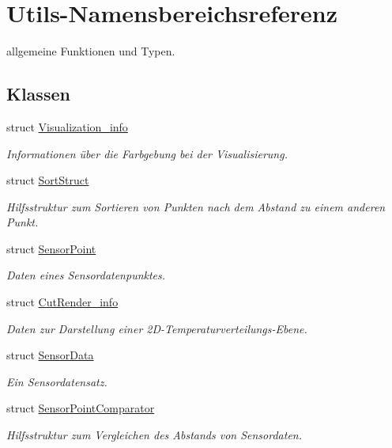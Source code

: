 \hypertarget{namespaceUtils}{\section{Utils-\/\-Namensbereichsreferenz}
\label{namespaceUtils}
}


allgemeine Funktionen und Typen.  


\subsection*{Klassen}
\begin{DoxyCompactItemize}
\item 
struct \hyperlink{structUtils_1_1Visualization__info}{Visualization\-\_\-info}
\begin{DoxyCompactList}\small\item\em Informationen über die Farbgebung bei der Visualisierung. \end{DoxyCompactList}\item 
struct \hyperlink{structUtils_1_1SortStruct}{Sort\-Struct}
\begin{DoxyCompactList}\small\item\em Hilfsstruktur zum Sortieren von Punkten nach dem Abstand zu einem anderen Punkt. \end{DoxyCompactList}\item 
struct \hyperlink{structUtils_1_1SensorPoint}{Sensor\-Point}
\begin{DoxyCompactList}\small\item\em Daten eines Sensordatenpunktes. \end{DoxyCompactList}\item 
struct \hyperlink{structUtils_1_1CutRender__info}{Cut\-Render\-\_\-info}
\begin{DoxyCompactList}\small\item\em Daten zur Darstellung einer 2\-D-\/\-Temperaturverteilungs-\/\-Ebene. \end{DoxyCompactList}\item 
struct \hyperlink{structUtils_1_1SensorData}{Sensor\-Data}
\begin{DoxyCompactList}\small\item\em Ein Sensordatensatz. \end{DoxyCompactList}\item 
struct \hyperlink{structUtils_1_1SensorPointComparator}{Sensor\-Point\-Comparator}
\begin{DoxyCompactList}\small\item\em Hilfsstruktur zum Vergleichen des Abstands von Sensordaten. \end{DoxyCompactList}\end{DoxyCompactItemize}
